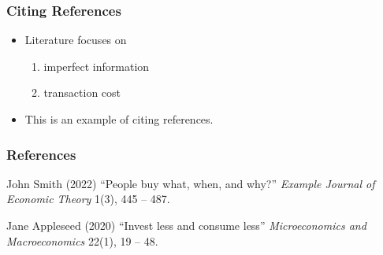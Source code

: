 \documentclass[
	11pt, %
]{beamer}
\begin{document}
\begin{frame}
	\frametitle{Citing References}

	\begin{itemize}
		\item Literature focuses on
		\begin{enumerate}
			\item imperfect information \cite{ref1}
			\item transaction cost \cite{ref2}
		\end{enumerate}
		\item This is an example of citing references.
	\end{itemize}
\end{frame}


\begin{frame} %
	\frametitle{References}
	
	\begin{thebibliography}{99} 
		\footnotesize %
		
			John Smith (2022)
			\newblock ``People buy what, when, and why?''
			\newblock \emph{Example Journal of Economic Theory} 1(3), 445 -- 487.
			
			Jane Appleseed (2020)
			\newblock ``Invest less and consume less''
			\newblock \emph{Microeconomics and Macroeconomics} 22(1), 19 -- 48.
	\end{thebibliography}
\end{frame}

\end{document}
